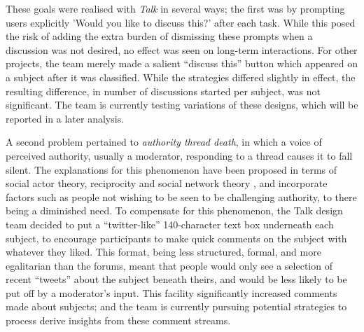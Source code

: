 \documentclass{sigchi}
\begin{document}
These goals were realised with \emph{Talk} in several ways; the first was by prompting users explicitly  'Would you like to discuss this?' after each task.  While this posed the risk of adding the extra burden of dismissing these prompts when a discussion was not desired, no effect was seen on long-term interactions.  For other projects, the team merely made a salient ``discuss this'' button which appeared on a subject after it was classified.  While the strategies differed slightly in effect, the resulting difference, in number of discussions started per subject, was not significant.  The team is currently testing variations of these designs, which will be reported in a later analysis.

A second problem pertained to \emph{authority thread death}, in which a voice of perceived authority, usually a moderator, responding to a thread causes it to fall silent.  The  explanations for this phenomenon have been proposed in terms of social actor theory,  reciprocity and social network theory \cite{preece2003online}, and incorporate factors such as people not wishing to be seen to be challenging authority, to there being a diminished need.  To compensate for this phenomenon, the Talk design team decided to put a ``twitter-like'' 140-character text box underneath each subject, to encourage participants to make quick comments on the subject with whatever they liked.  This format, being less structured, formal, and more egalitarian than the forums, meant that people would only see a selection of recent ``tweets'' about the subject beneath theirs, and would be less likely to be put off by a moderator's input.  This facility significantly increased comments made about subjects; and the team is currently pursuing potential strategies to process  derive insights from these comment streams.


\end{document}
